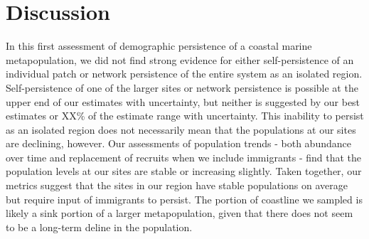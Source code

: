 \documentclass[12pt, oneside]{article}   	%
\begin{document}
\section*{Discussion}
In this first assessment of demographic persistence of a coastal marine metapopulation, we did not find strong evidence for either self-persistence of an individual patch or network persistence of the entire system as an isolated region. Self-persistence of one of the larger sites or network persistence is possible at the upper end of our estimates with uncertainty, but neither is suggested by our best estimates or XX\% of the estimate range with uncertainty. This inability to persist as an isolated region does not necessarily mean that the populations at our sites are declining, however. Our assessments of population trends - both abundance over time and replacement of recruits when we include immigrants - find that the population levels at our sites are stable or increasing slightly. Taken together, our metrics suggest that the sites in our region have stable populations on average but require input of immigrants to persist. The portion of coastline we sampled is likely a sink portion of a larger metapopulation, given that there does not seem to be a long-term deline in the population. %


\end{document}
